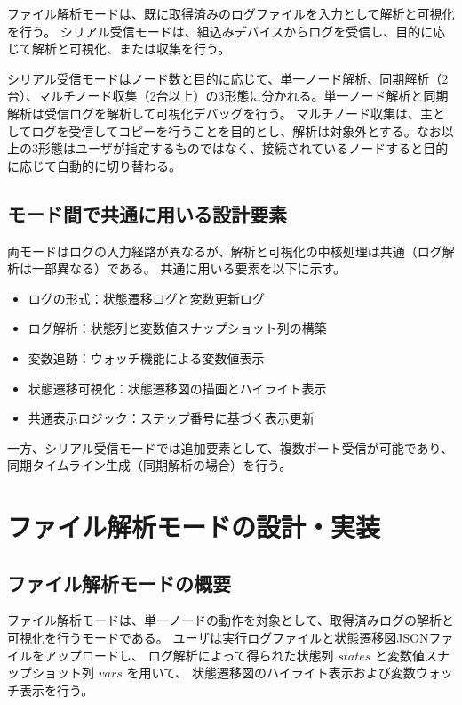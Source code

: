\documentclass[12pt]{jreport}
\begin{document}
\begin{par}
ファイル解析モードは、既に取得済みのログファイルを入力として解析と可視化を行う。
シリアル受信モードは、組込みデバイスからログを受信し、目的に応じて解析と可視化、または収集を行う。
\end{par}

\begin{par}
シリアル受信モードはノード数と目的に応じて、単一ノード解析、同期解析（2台）、マルチノード収集（2台以上）の3形態に分かれる。単一ノード解析と同期解析は受信ログを解析して可視化デバッグを行う。
マルチノード収集は、主としてログを受信してコピーを行うことを目的とし、解析は対象外とする。なお以上の3形態はユーザが指定するものではなく、接続されているノードすると目的に応じて自動的に切り替わる。
\end{par}

\subsection{モード間で共通に用いる設計要素}
\begin{par}
両モードはログの入力経路が異なるが、解析と可視化の中核処理は共通（ログ解析は一部異なる）である。
共通に用いる要素を以下に示す。
\end{par}
\begin{itemize}
  \item ログの形式：状態遷移ログと変数更新ログ
  \item ログ解析：状態列と変数値スナップショット列の構築
  \item 変数追跡：ウォッチ機能による変数値表示
  \item 状態遷移可視化：状態遷移図の描画とハイライト表示
  \item 共通表示ロジック：ステップ番号に基づく表示更新
\end{itemize}

\begin{par}
一方、シリアル受信モードでは追加要素として、複数ポート受信が可能であり、同期タイムライン生成（同期解析の場合）を行う。
\end{par}

\section{ファイル解析モードの設計・実装}
\label{sec:log_mode}

\subsection{ファイル解析モードの概要}
\begin{par}
ファイル解析モードは、単一ノードの動作を対象として、取得済みログの解析と可視化を行うモードである。
ユーザは実行ログファイルと状態遷移図JSONファイルをアップロードし、
ログ解析によって得られた状態列 $states$ と変数値スナップショット列 $vars$ を用いて、
状態遷移図のハイライト表示および変数ウォッチ表示を行う。
\end{par}
\end{document}
